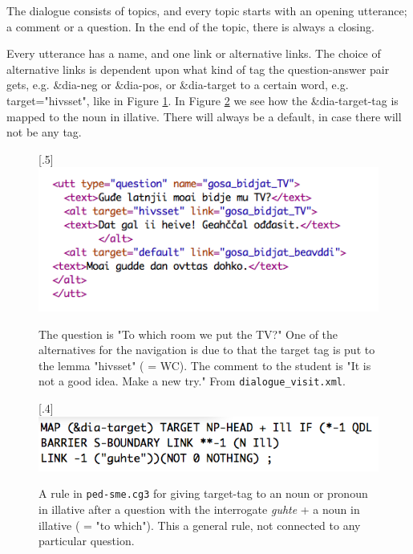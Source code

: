 \documentclass[11pt]{article}
\begin{document}
The dialogue consists of topics, and every topic starts with an opening utterance; a comment or a question. In the end of the topic, there is always a closing.  

Every utterance has a name, and one link or alternative links. The choice of alternative links is dependent upon what kind of tag the question-answer pair gets, e.g. \&dia-neg or \&dia-pos, or \&dia-target to a certain word, e.g. target="hivsset", like in Figure \ref{TV}.  In Figure \ref{targetIll} we see how the \&dia-target-tag is mapped to the noun in illative. There will always be a default, in case there will not be any tag. \\

\begin{figure}[htbp]
\begin{center}
\scalebox{.5}[.5]{\includegraphics{presentation/img/gosabidjatTV.png}}
\caption{The question is "To which room we put the TV?" One of the alternatives for the navigation is due to that the target tag is put to the lemma "hivsset" ( = WC). The comment to the student is "It is not a good idea. Make a new try." From \texttt{dialogue\_visit.xml}.}
\label{TV}
\end{center}
\end{figure}


\begin{figure}[htbp]
\begin{center}
\scalebox{.4}[.4]{\includegraphics{presentation/img/targetIll.png}}
\caption{A rule in \texttt{ped-sme.cg3} for giving target-tag to an noun or pronoun in illative after a question with the interrogate \textit{guhte} + a noun in illative ( = "to which"). This a general rule, not connected to any particular question.}
\label{targetIll}
\end{center}
\end{figure}
\end{document}
